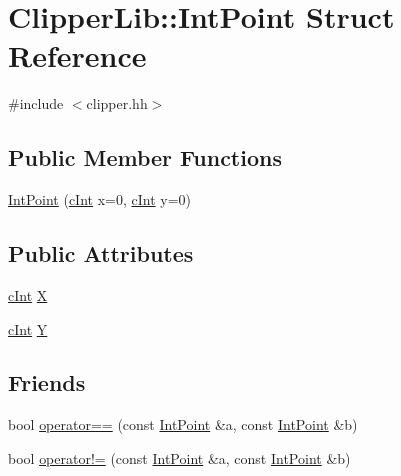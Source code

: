 \hypertarget{struct_clipper_lib_1_1_int_point}{}\section{Clipper\+Lib\+::Int\+Point Struct Reference}
\label{struct_clipper_lib_1_1_int_point}


{\ttfamily \#include $<$clipper.\+hh$>$}

\subsection*{Public Member Functions}
\begin{DoxyCompactItemize}
\item 
\mbox{\hyperlink{struct_clipper_lib_1_1_int_point_a819e71f9269e99f151a3a99c4283cd43}{Int\+Point}} (\mbox{\hyperlink{namespace_clipper_lib_a7156730a24951629192d4831334bafaa}{c\+Int}} x=0, \mbox{\hyperlink{namespace_clipper_lib_a7156730a24951629192d4831334bafaa}{c\+Int}} y=0)
\end{DoxyCompactItemize}
\subsection*{Public Attributes}
\begin{DoxyCompactItemize}
\item 
\mbox{\hyperlink{namespace_clipper_lib_a7156730a24951629192d4831334bafaa}{c\+Int}} \mbox{\hyperlink{struct_clipper_lib_1_1_int_point_a608d16d39c8762e6c3c0a688efb310b6}{X}}
\item 
\mbox{\hyperlink{namespace_clipper_lib_a7156730a24951629192d4831334bafaa}{c\+Int}} \mbox{\hyperlink{struct_clipper_lib_1_1_int_point_a8445d190cd9013bb34d49b5a8a240425}{Y}}
\end{DoxyCompactItemize}
\subsection*{Friends}
\begin{DoxyCompactItemize}
\item 
bool \mbox{\hyperlink{struct_clipper_lib_1_1_int_point_a6afef09ee09723a387e3046287e2635b}{operator==}} (const \mbox{\hyperlink{struct_clipper_lib_1_1_int_point}{Int\+Point}} \&a, const \mbox{\hyperlink{struct_clipper_lib_1_1_int_point}{Int\+Point}} \&b)
\item 
bool \mbox{\hyperlink{struct_clipper_lib_1_1_int_point_aa37b2afb6cbc44cb9cd13ecc009decfb}{operator!=}} (const \mbox{\hyperlink{struct_clipper_lib_1_1_int_point}{Int\+Point}} \&a, const \mbox{\hyperlink{struct_clipper_lib_1_1_int_point}{Int\+Point}} \&b)
\end{DoxyCompactItemize}


